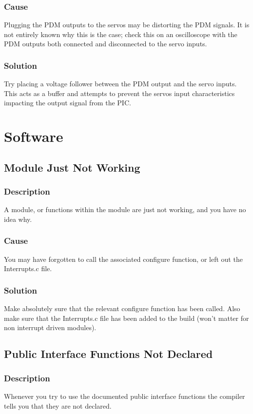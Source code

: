 \documentclass[]{report}
\begin{document}
\subsection{Cause}
Plugging the PDM outputs to the servos may be distorting the PDM signals. It is not entirely known why this is the case; check this on an oscilloscope with the PDM outputs both connected and disconnected to the servo inputs.

\subsection{Solution}
Try placing a voltage follower between the PDM output and the servo inputs. This acts as a buffer and attempts to prevent the servos input characteristics impacting the output signal from the PIC.

\chapter{Software}
\section{Module Just Not Working}
\subsection{Description}
A module, or functions within the module are just not working, and you have no idea why.

\subsection{Cause}
You may have forgotten to call the associated configure function, or left out the Interrupts.c file.

\subsection{Solution}
Make absolutely sure that the relevant configure function has been called. Also make sure that the Interrupts.c file has been added to the build (won't matter for non interrupt driven modules).

\section{Public Interface Functions Not Declared}
\subsection{Description}
Whenever you try to use the documented public interface functions the compiler tells you that they are not declared.
\end{document}
